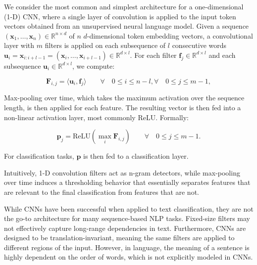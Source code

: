 We consider the most common and simplest architecture for a one-dimensional (1-D) \ac{CNN}, where a single layer of convolution is applied to the input token vectors obtained from an unsupervised neural language model. Given a sequence $(\bm{x}_1, \ldots, \bm{x}_n) \in \mathbb{R}^{n \times d}$ of $n$ $d$-dimensional token embedding vectors, a convolutional layer with $m$ filters is applied on each subsequence of $l$ consecutive words $\bm{u}_i = \bm{x}_{i:i+l-1} = (\bm{x}_i, \ldots, \bm{x}_{i+l-1}) \in \mathbb{R}^{d \times l}$. For each filter $\bm{f}_j \in \mathbb{R}^{d \times l}$ and each subsequence $\bm{u}_i \in \mathbb{R}^{d \times l}$, we compute:

\begin{equation}
\bm{F}_{i,j} = \langle \bm{u}_i, \bm{f}_j\rangle \qquad \forall \quad 0 \leq i \leq n-l, \forall \quad 0 \leq j \leq m-1,
\end{equation}

Max-pooling over time, which takes the maximum activation over the sequence length, is then applied for each feature. The resulting vector is then fed into a non-linear activation layer, most commonly ReLU. Formally:

\begin{equation}
    \bm{p}_j = \mathrm{ReLU}(\max_{i}\bm{F}_{i,j}) \qquad \forall \quad 0 \leq j \leq m-1.
\end{equation}

For classification tasks, $\bm{p}$ is then fed to a classification layer.

Intuitively, 1-D convolution filters act as n-gram detectors, while max-pooling over time induces a thresholding behavior that essentially separates features that are relevant to the final classification from features that are not.

While \acp{CNN} have been successful when applied to text classification, they are not the go-to architecture for many sequence-based \ac{NLP} tasks. Fixed-size filters may not effectively capture long-range dependencies in text. Furthermore, \acp{CNN} are designed to be translation-invariant, meaning the same filters are applied to different regions of the input. However, in language, the meaning of a sentence is highly dependent on the order of words, which is not explicitly modeled in \acp{CNN}. 



